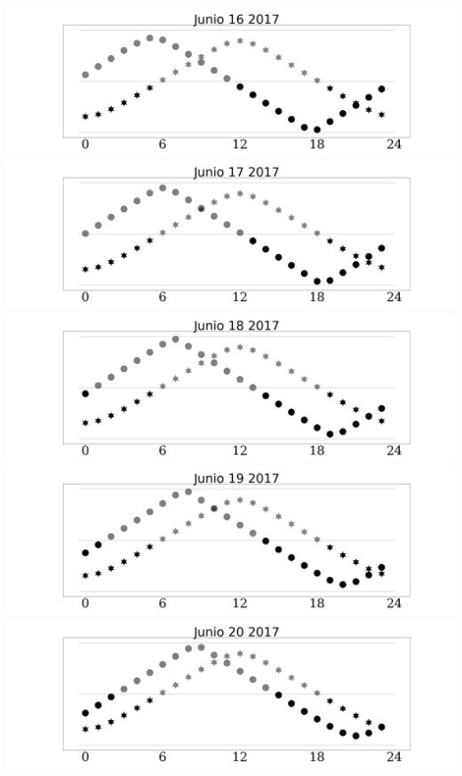 \documentclass{report}
\begin{document}
\includegraphics[width=1.00\textwidth]{Junio_16_2017.png}\newpage
\includegraphics[width=1.00\textwidth]{Junio_17_2017.png}\newpage
\includegraphics[width=1.00\textwidth]{Junio_18_2017.png}\newpage
\includegraphics[width=1.00\textwidth]{Junio_19_2017.png}\newpage
\includegraphics[width=1.00\textwidth]{Junio_20_2017.png}\newpage
\end{document}
